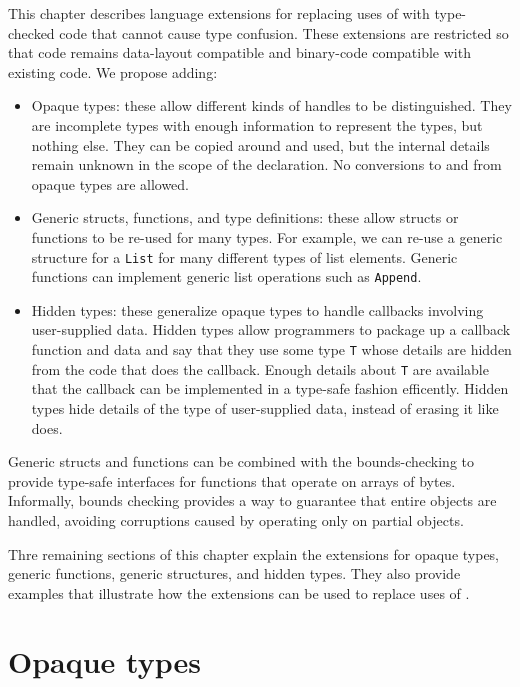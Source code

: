 This chapter describes language extensions for replacing uses of \uncheckedptrvoid{}
with type-checked code that cannot cause type confusion.   These extensions
are restricted so that code remains data-layout compatible and binary-code
compatible with existing code.  We propose adding:
\begin{itemize}
\item Opaque types: these allow different kinds of handles to be distinguished.
They are incomplete types with enough information to represent
the types, but nothing else.  They can be copied around and used, but the internal
details remain unknown in the scope of the declaration.  No conversions to and 
from opaque types are allowed.

\item Generic structs, functions, and type definitions: these allow structs
or functions to be re-used for many types.   For example,
we can re-use a generic structure for a  \lstinline+List+ for many different types of list
elements.  Generic functions can implement generic list operations such as \lstinline+Append+.

\item Hidden types: these generalize opaque types to handle callbacks involving
user-supplied data.  Hidden types allow programmers to package up a callback function and data and
say that they use  some type \lstinline+T+ whose details are hidden from the code that does
the callback.   Enough details about \lstinline+T+ are available that the callback can be 
implemented in a type-safe fashion efficently.  Hidden types hide details of the type 
of user-supplied data, instead of erasing it like \uncheckedptrvoid{} does.
\end{itemize}

Generic structs and functions can be combined with the bounds-checking 
to provide type-safe interfaces for functions that operate on arrays of bytes.
Informally, bounds checking provides a way to guarantee that entire objects are handled,
avoiding corruptions caused by operating only on partial objects.

Thre remaining sections of this chapter explain the extensions for 
opaque types, generic functions, generic structures, and hidden types.  They also
provide examples that illustrate how the extensions can be used to
replace uses of \uncheckedptrvoid{}.

\section{Opaque types}

